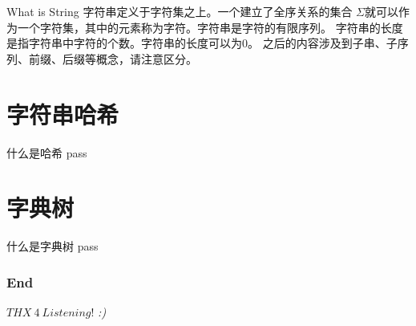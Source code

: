 \documentclass{ldr-simple-gray}
\begin{document}
  \begin{frame}{What is String}
    字符串定义于字符集之上。一个建立了全序关系的集合 $\Sigma$就可以作为一个字符集，其中的元素称为字符。字符串是字符的有限序列。
    \newline\newline
    字符串的长度是指字符串中字符的个数。字符串的长度可以为0。
    \newline\newline
    之后的内容涉及到子串、子序列、前缀、后缀等概念，请注意区分。
  \end{frame}

  \section{字符串哈希}
  \begin{frame}{什么是哈希}
    pass
  \end{frame}

  \section{字典树}
  \begin{frame}{什么是字典树}
    pass
  \end{frame}

  \begin{frame} %
    \frametitle{End}
    \begin{center}
      \Huge{$THX\ 4\ Listening!$}
      \emph{:)}
    \end{center}
  \end{frame}
\end{document}
